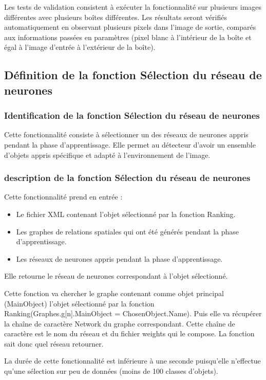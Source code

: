 \documentclass[debug,nodate,hideweeklyreports,noposter]{polytech/polytech}
\begin{document}
Les tests de validation consistent à exécuter la fonctionnalité sur plusieurs images différentes avec plusieurs boîtes différentes. Les résultats seront vérifiés automatiquement en observant plusieurs pixels dans l'image de sortie, comparés aux informations passées en paramètres (pixel blanc à l'intérieur de la boîte et égal à l'image d'entrée à l'extérieur de la boîte).

\subsection{Définition de la fonction Sélection du réseau de neurones}

\subsubsection{Identification de la fonction Sélection du réseau de neurones}

Cette fonctionnalité consiste à sélectionner un des réseaux de neurones appris pendant la phase d’apprentissage. Elle permet au détecteur d’avoir un ensemble d’objets appris spécifique et adapté à l’environnement de l’image.

\subsubsection{description de la fonction Sélection du réseau de neurones}

Cette fonctionnalité prend en entrée : 
\begin{itemize}
\item Le fichier XML contenant l’objet sélectionné par la fonction Ranking.
\item Les graphes de relations spatiales qui ont été générés pendant la phase d’apprentissage.
\item Les réseaux de neurones appris pendant la phase d’apprentissage.
\end{itemize}

Elle retourne le réseau de neurones correspondant à l’objet sélectionné.

Cette fonction va chercher le graphe contenant comme objet principal (MainObject) l’objet sélectionné par la fonction Ranking(Graphes.g[n].MainObject = ChosenObject.Name).
Puis elle va récupérer la chaîne de caractère Network du graphe correspondant.
Cette chaîne de caractère est le nom du réseau et du fichier weights qui le compose. La fonction sait donc quel réseau retourner.

La durée de cette fonctionnalité est inférieure à une seconde puisqu'elle n'effectue qu'une sélection sur peu de données (moins de 100 classes d'objets).
\end{document}
